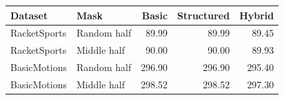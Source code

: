 \begin{tabular}{llrrr}\toprule
Dataset & Mask & Basic & Structured & Hybrid \\ \midrule
RacketSports & Random half & 89.99 & 89.99 & 89.45 \\
RacketSports & Middle half & 90.00 & 90.00 & 89.93 \\
BasicMotions & Random half & 296.90 & 296.90 & 295.40 \\
BasicMotions & Middle half & 298.52 & 298.52 & 297.30 \\
\bottomrule\end{tabular}